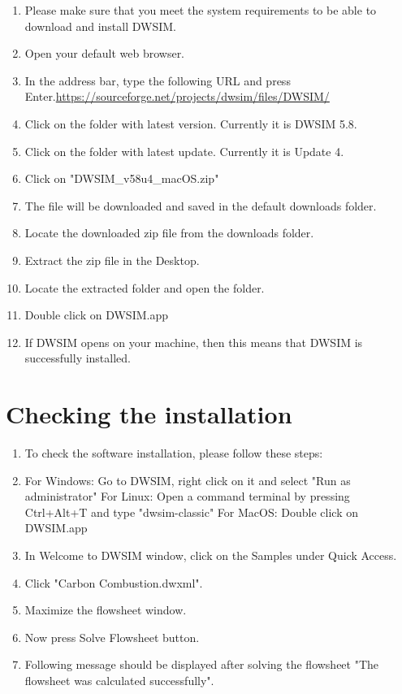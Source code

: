 \documentclass[12pt,a4paper]{article}
\begin{document}
\begin{enumerate}
\item Please make sure that you meet the system requirements to be able to download and install DWSIM.
\item Open your default web browser.
\item In the address bar, type the following URL and press Enter.\newline \url{https://sourceforge.net/projects/dwsim/files/DWSIM/}

\item Click on the folder with latest version. Currently it is DWSIM 5.8.

\item Click on the folder with latest update. Currently it is Update 4.
\item Click on "DWSIM\_v58u4\_macOS.zip"
\item The file will be downloaded and saved in the default downloads folder.
\item Locate the downloaded zip file from the downloads folder.
\item Extract the zip file in the Desktop.
\item Locate the extracted folder and open the folder.
\item Double click on DWSIM.app
\item If DWSIM opens on your machine, then this means that DWSIM is successfully installed.

\end{enumerate}

\section{Checking the installation}

\begin{enumerate}

\item To check the software installation, please follow these steps:
\item For Windows: Go to DWSIM, right click on it and select "Run as administrator"
\newline For Linux: Open a command terminal by pressing Ctrl+Alt+T and type "dwsim-classic"
\newline For MacOS: Double click on DWSIM.app
\item In Welcome to DWSIM window, click on the Samples under Quick Access.
\item Click "Carbon Combustion.dwxml".
\item Maximize the flowsheet window.
\item Now press Solve Flowsheet button.
\item Following message should be displayed after solving the flowsheet "The flowsheet was calculated successfully".

\end{enumerate}
\end{document}
